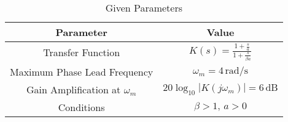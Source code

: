  \begin{table}[h]
        \centering
        \begin{tabular}{|c|c|}
            \hline
            \textbf{Parameter} & \textbf{Value} \\
            \hline
            Transfer Function & \( K(s) = \frac{1 + \frac{s}{a}}{1 + \frac{s}{\beta a}} \) \\
            \hline
            Maximum Phase Lead Frequency & \( \omega_m = 4 \, \text{rad/s} \) \\
            \hline
            Gain Amplification at \( \omega_m \) & \( 20\log_{10}|K(j\omega_m)| = 6 \, \text{dB} \) \\
            \hline
            Conditions & \( \beta > 1, \, a > 0 \) \\
            \hline
        \end{tabular}
        \caption{Given Parameters}
        \label{tab:given-parameters}
    \end{table}
